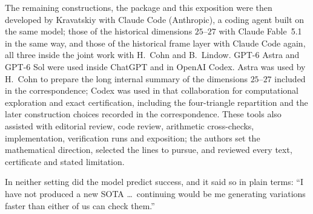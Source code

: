 \documentclass[11pt]{amsart}
\theoremstyle{remark}
\begin{document}
The remaining constructions, the package \cite{repo} and this exposition were then
developed by Kravatskiy with Claude Code (Anthropic), a coding agent built on the
same model; those of the historical dimensions $25$--$27$ with Claude Fable~5.1
in the same way, and those of the historical frame layer with Claude Code again,
all three inside the joint work with H.~Cohn and B.~Lindow. GPT-6 Astra and GPT-6
Sol were used inside ChatGPT and in OpenAI Codex. Astra was used by H.~Cohn to
prepare the long internal summary of the dimensions $25$--$27$ included in the
correspondence; Codex was used in that collaboration for computational
exploration and exact certification, including the four-triangle repartition and
the later construction choices recorded in the correspondence. These tools also
assisted with editorial review, code review, arithmetic cross-checks,
implementation, verification runs and exposition;
the authors set the mathematical direction, selected the lines to pursue, and
reviewed every text, certificate and stated limitation.

In neither setting did the model predict success, and it said so in plain terms:
``I have not produced a new SOTA \dots\ continuing would be me generating
variations faster than either of us can check them.''



\end{document}
